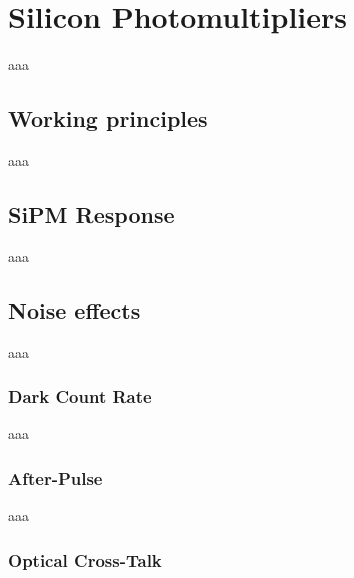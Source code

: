 \chapter{Silicon Photomultipliers}
aaa

\section{Working principles}
aaa

\section{SiPM Response}
aaa

\section{Noise effects}
aaa

\subsection{Dark Count Rate}
aaa

\subsection{After-Pulse}
aaa

\subsection{Optical Cross-Talk}

